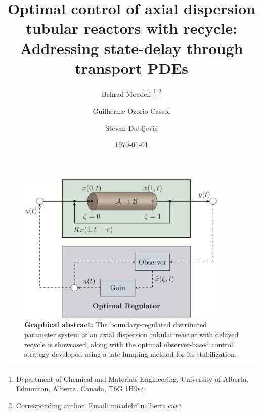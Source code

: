 \documentclass[letterpaper,12pt]{article}
\title{Optimal control of axial dispersion tubular reactors with recycle: Addressing state-delay through transport PDEs}
\author{
  Behrad Moadeli \thanks{Department of Chemical and Materials Engineering, University of Alberta, Edmonton, Alberta, Canada, T6G 1H9} \thanks{Corresponding author. Email: moadeli@ualberta.ca} \and
  Guilherme Ozorio Cassol\footnotemark[1] \and
  Stevan Dubljevic \footnotemark[1] 
  }
\date{\today}
\begin{document}
\maketitle

\begin{figure}[htbp!]
  \centering
  \includegraphics*[width=0.9\textwidth]{Figures/abstract_final.PNG}
  \caption*{\textbf{Graphical abstract:}
  The boundary-regulated distributed parameter system of an axial dispersion tubular reactor with delayed recycle is showcased, along with the optimal observer-based control strategy developed using a late-lumping method for its stabilization.}
\end{figure}
\end{document}
